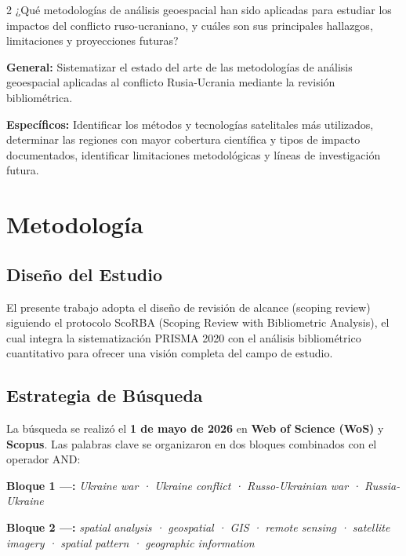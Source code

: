 \documentclass[12pt, a4paper]{article}
\begin{document}
\begin{multicols}{2}
¿Qué metodologías de análisis geoespacial han sido aplicadas para estudiar los impactos del conflicto ruso-ucraniano, y cuáles son sus principales hallazgos, limitaciones y proyecciones futuras?

\textbf{General:} Sistematizar el estado del arte de las metodologías de análisis geoespacial aplicadas al conflicto Rusia-Ucrania mediante la revisión bibliométrica.

\textbf{Específicos:} Identificar los métodos y tecnologías satelitales más utilizados, determinar las regiones con mayor cobertura científica y tipos de impacto documentados, identificar limitaciones metodológicas y líneas de investigación futura.

\end{multicols}

\clearpage

\section{Metodología}

\subsection{Diseño del Estudio}

El presente trabajo adopta el diseño de revisión de alcance (scoping review) siguiendo el protocolo ScoRBA (Scoping Review with Bibliometric Analysis), el cual integra la sistematización PRISMA 2020 con el análisis bibliométrico cuantitativo para ofrecer una visión completa del campo de estudio.

\subsection{Estrategia de Búsqueda}

La búsqueda se realizó el \textbf{1 de mayo de 2026} en \textbf{Web of Science (WoS)} y \textbf{Scopus}. Las palabras clave se organizaron en dos bloques combinados con el operador AND:

\textbf{Bloque 1 —:} \textit{Ukraine war · Ukraine conflict · Russo-Ukrainian war · Russia-Ukraine}

\textbf{Bloque 2 —:} \textit{spatial analysis · geospatial · GIS · remote sensing · satellite imagery · spatial pattern · geographic information}
\end{document}
